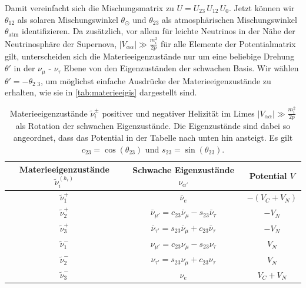 Damit vereinfacht sich die Mischungsmatrix zu $U = U_{2 3} \, U_{1 2} \, U_0$.
Jetzt können wir $\theta_{1 2}$ als solaren Mischungswinkel $\theta_\odot$ und $\theta_{2 3}$ als atmosphärischen Mischungswinkel $\theta_\text{atm}$ identifizieren.
Da zusätzlich, vor allem für leichte Neutrinos in der Nähe der Neutrinosphäre der Supernova, $|V_{\alpha \alpha}| \gg \frac{m^2_i}{2 p}$ für alle Elemente der Potentialmatrix gilt, unterscheiden sich die Materieeigenzustände nur um eine
beliebige Drehung $\theta'$ in der $\nu_\mu$ - $\nu_\tau$ Ebene von den Eigenzuständen der schwachen Basis.
Wir wählen $\theta' = -\theta_\text{2 3}$, um möglichst einfache Ausdrücke der Materieeigenzustände zu erhalten, wie sie in \autoref{tab:materieeigis} dargestellt sind.
\begin{table}[H]
    \centering
    \begin{tabular}{S S S}
      \toprule
    {Materieeigenzustände $\tilde{\nu}^{(h_i)}_i$} & {Schwache Eigenzustände $\nu_{\alpha'}$} & {Potential $V$} \\
      \midrule
       {$\tilde{\nu}^+_1$} & {$\bar{\nu}_e$}                                                        &  {$- (V_C + V_N)$} \\
       {$\tilde{\nu}^+_2$} & {$\bar{\nu}_{\mu'}  = c_{2 3} \bar{\nu}_\mu - s_{2 3} \bar{\nu}_\tau$} &  {$- V_N$} \\
       {$\tilde{\nu}^+_3$} & {$\bar{\nu}_{\tau'} = s_{2 3} \bar{\nu}_\mu + c_{2 3} \bar{\nu}_\tau$} &  {$- V_N$} \\
       {$\tilde{\nu}^-_1$} & {$\nu_{\mu'}        = c_{2 3} \nu_\mu       - s_{2 3} \nu_\tau$}       &  {$V_N$} \\
       {$\tilde{\nu}^-_2$} & {$\nu_{\tau'}       = s_{2 3} \nu_\mu       + c_{2 3} \nu_\tau$}       &  {$V_N$} \\
       {$\tilde{\nu}^-_3$} & {$\nu_e$}                                                              &  {$V_C + V_N$} \\
    \bottomrule
    \end{tabular}
    \caption{Materieeigenzustände $\tilde{\nu}^\pm_i$ positiver und negativer Helizität im Limes $|V_{\alpha \alpha}| \gg \frac{m^2_i}{2 p}$ als Rotation der schwachen Eigenzustände. Die Eigenzustände sind dabei so
            angeordnet, dass das Potential in der Tabelle nach unten hin ansteigt. Es gilt $c_{2 3} = \cos(\theta_{2 3})$ und $s_{2 3} = \sin(\theta_{2 3})$.}
    \label{tab:materieeigis}
\end{table}

